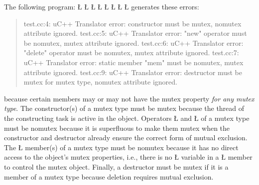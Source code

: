 \documentclass[openright,twoside]{report}
\begin{document}
The following program:
\LGinlinefalse\LGbegin\lgrinde
\L{}
\L{}
\L{\LB{}}
\CE{}\L{\LB{}}
\CE{}\L{\LB{}}
\CE{}\L{\LB{}}
\CE{}\L{\LB{}}
\CE{}\L{\LB{\};}}
\endlgrinde\LGend
generates these errors:
\begin{quote}
\BGfont
test.cc:4: uC++ Translator error: constructor must be mutex, nomutex attribute ignored.
\newline
test.cc:5: uC++ Translator error: "new" operator must be nomutex, mutex attribute ignored.
\newline
test.cc:6: uC++ Translator error: "delete" operator must be nomutex, mutex attribute ignored.
\newline
test.cc:7: uC++ Translator error: static member "mem" must be nomutex, mutex attribute ignored.
\newline
test.cc:9: uC++ Translator error: destructor must be mutex for mutex type, nomutex attribute ignored.
\end{quote}
because certain members may or may not have the mutex property \emph{for any mutex type}.
The constructor(s) of a mutex type must be mutex because the thread of the constructing task is active in the object.
Operators \LGinlinetrue\LGbegin\lgrinde\L{}\endlgrinde\LGend{} and \LGinlinetrue\LGbegin\lgrinde\L{}\endlgrinde\LGend{} of a mutex type must be nomutex because it is superfluous to make them mutex when the constructor and destructor already ensure the correct form of mutual exclusion.
The \LGinlinetrue\LGbegin\lgrinde\L{}\endlgrinde\LGend{} member(s) of a mutex type must be nomutex because it has no direct access to the object's mutex properties, i.e., there is no \LGinlinetrue\LGbegin\lgrinde\L{}\endlgrinde\LGend{} variable in a \LGinlinetrue\LGbegin\lgrinde\L{}\endlgrinde\LGend{} member to control the mutex object.
Finally, a destructor must be mutex if it is a member of a mutex type because deletion requires mutual exclusion.
\end{document}
